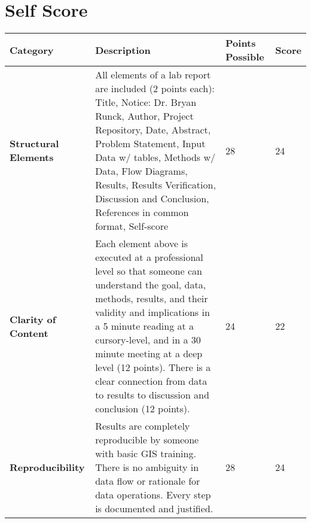 \documentclass[article,12pt]{article}
\numberwithin{equation}{section}
\begin{document}
\section*{Self Score}
\begin{tabular}{|p{.2\linewidth}|p{.2\linewidth}|p{.2\linewidth}|p{.1\linewidth}|}
	\hline
	\textbf{Category}            & \textbf{Description}                                                                                                                                                                                                                                                                                                                                              & \textbf{Points Possible} & \textbf{Score} \\ \hline
\vspace{.2in}\textbf{Structural Elements} & {\tiny All elements of a lab report are included (2 points each): Title, Notice: Dr. Bryan Runck, Author, Project Repository, Date, Abstract, Problem Statement, Input Data w/ tables, Methods w/ Data, Flow Diagrams, Results, Results Verification, Discussion and Conclusion, References in common format, Self-score}                                        & \vspace{.2in}28              &   \vspace{.2in}24    \\ \hline
	\vspace{.2in}\textbf{Clarity of Content}  & {\tiny Each element above is executed at a professional level so that someone can understand the goal, data, methods, results, and their validity and implications in a 5 minute reading at a cursory-level, and in a 30 minute meeting at a deep level (12 points). There is a clear connection from data to results to discussion and conclusion (12 points).} & \vspace{.2in}24              &  \vspace{.2in}22     \\ \hline
	\vspace{.2in}\textbf{Reproducibility}     & {\tiny Results are completely reproducible by someone with basic GIS training. There is no ambiguity in data flow or rationale for data operations. Every step is documented and justified.}                                                                                                                                                                     & \vspace{.2in}28              &     \vspace{.2in}24  \\ \hline

\end{tabular}
\end{document}
